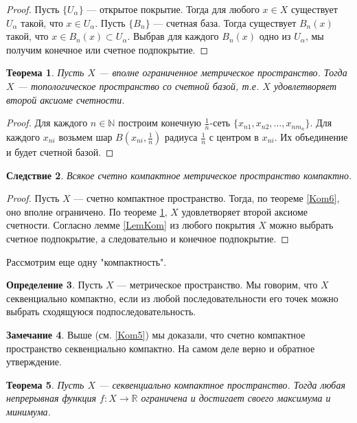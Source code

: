 \documentclass[12pt, titlepage, oneside]{amsbook}
\newcommand{\NN}{\mathbb{N}}
\newcommand{\RR}{\mathbb{R}}
\newtheorem{theorem}{Теорема}[chapter]
\newtheorem{corollary}[theorem]{Следствие}
\theoremstyle{definition}
\newtheorem{definition}[theorem]{Определение}
\newtheorem{remark}[theorem]{Замечание}
\theoremstyle{remark}
\begin{document}
\begin{proof}
Пусть $\{U_{\alpha}\}$ --- открытое покрытие. Тогда для любого $x\in X$ существует $U_{\alpha}$ такой, что $x\in U_{\alpha}$. Пусть $\{B_n\}$ --- счетная база. Тогда существует $B_n(x)$ такой, что $x\in B_n(x)\subset U_{\alpha}$. Выбрав для каждого $B_n(x)$ одно из $U_{\alpha}$, мы получим конечное или счетное подпокрытие.
\end{proof}

 \begin{theorem}
\label{MetS}
Пусть $X$ --- вполне ограниченное метрическое пространство. Тогда $X$ --- топологическое пространство со счетной базой, т.е. $X$ удовлетворяет второй аксиоме счетности.
\end{theorem}

\begin{proof}
Для каждого $n\in\NN$ построим конечную $\frac{1}{n}$-сеть $\{x_{n1},x_{n2},\ldots,x_{nm_n}\}$. Для каждого $x_{ni}$ возьмем шар $B(x_{ni},\frac{1}{n})$ радиуса $\frac{1}{n}$ с центром в $x_{ni}$. Их объединение и будет счетной базой.
\end{proof}

 \begin{corollary}
\label{Kom7}
Всякое счетно компактное метрическое пространство компактно.
\end{corollary}

\begin{proof}
Пусть $X$ --- счетно компактное пространство. Тогда, по теореме \ref{Kom6}, оно вполне ограничено. По теореме \ref{MetS}, $X$ удовлетворяет второй аксиоме счетности. Согласно лемме \ref{LemKom} из любого покрытия $X$ можно выбрать счетное подпокрытие, а следовательно и конечное подпокрытие.
\end{proof}

Рассмотрим еще одну "компактность".

\begin{definition}
Пусть $X$ --- метрическое пространство. Мы говорим, что $X$ секвенциально компактно, если из любой последовательности его точек можно выбрать сходящуюся подпоследовательность.
\end{definition}

\begin{remark}
Выше (см. \ref{Kom5}) мы доказали, что счетно компактное пространство секвенциально компактно. На самом деле верно и обратное утверждение.
\end{remark}

\begin{theorem}
\label{Kom8}
Пусть $X$ --- секвенциально компактное пространство. Тогда любая непрерывная функция $f\colon X\rightarrow\RR$ ограничена и достигает своего максимума и минимума.
\end{theorem}
\end{document}
